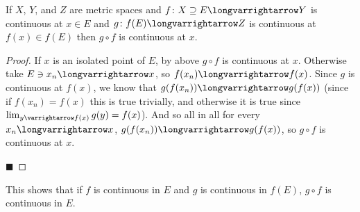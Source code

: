 \documentclass[10pt]{article}
\begin{document}
\begin{prop*}

    If $X$, $Y$, and $Z$ are metric spaces and $f\colon X\supseteq E\longvarrightarrow Y$ is continuous at $x\in E$ and $g\colon f(E)\longvarrightarrow Z$ is continuous at $f(x)\in f(E)$ then
    $g\circ f$ is continuous at $x$.

\end{prop*}

\begin{proof}

    If $x$ is an isolated point of $E$, by above $g\circ f$ is continuous at $x$.
    Otherwise take $E\ni x_n\longvarrightarrow x$, so $f(x_n)\longvarrightarrow f(x)$.
    Since $g$ is continuous at $f(x)$, we know that $g(f(x_n))\longvarrightarrow g(f(x))$ (since if $f(x_n)=f(x)$ this is true trivially, and otherwise it is true since
    $\lim_{y\varrightarrow f(x)}g(y)=f(x)$).
    And so all in all for every $x_n\longvarrightarrow x$, $g(f(x_n))\longvarrightarrow g(f(x))$, so $g\circ f$ is continuous at $x$.

    \hfill$\blacksquare$

\end{proof}

This shows that if $f$ is continuous in $E$ and $g$ is continuous in $f(E)$, $g\circ f$ is continuous in $E$.
\end{document}

